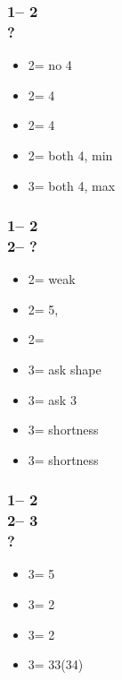 \documentclass[12pt, a4paper]{report}
\begin{document}
{{        \subsubsection*{1\nt -- 2\clubs\\
                        ?}
        \begin{itemize}
            \item 2\diams = no 4\major
            \item 2\hearts = 4\hearts
            \item 2\spades = 4\spades
            \item 2\nt = both 4\major, min
            \item 3\clubs = both 4\major, max
        \end{itemize}

        \subsubsection*{1\nt -- 2\clubs\\
                        2\diams -- ?}
        \begin{itemize}
            \item 2\hearts = \major weak
            \item 2\spades = 5\spades, \inv
            \item 2\nt = \inv
            \item 3\clubs = ask shape
            \item 3\diams = ask 3\major
            \item 3\hearts = \clubs shortness
            \item 3\spades = \diams shortness
        \end{itemize}

        \subsubsection*{1\nt -- 2\clubs\\
                        2\diams -- 3\clubs\\
                        ?}
        \begin{itemize}
            \item 3\diams = 5\minor \qq
            \item 3\hearts = 2\spades
            \item 3\spades = 2\hearts
            \item 3\nt = 33(34)
        \end{itemize}

}}
\end{document}
